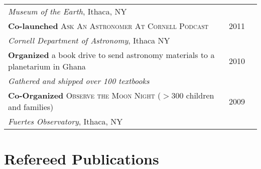 \documentclass[10pt]{article} %
\begin{document}
\begin{tabular}{l>{\hfill}p{1.1cm}r}
{\it Museum of the Earth}, Ithaca, NY \\
{\bf Co-launched} \textsc{Ask An Astronomer At Cornell Podcast} & 2011\\
{\it Cornell Department of Astronomy}, Ithaca NY  \\
{\bf Organized} a book drive to send astronomy materials to a planetarium in Ghana & 2010\\
{\it Gathered and shipped over 100 textbooks} \\
{\bf Co-Organized} \textsc{Observe the Moon Night} ($> 300$ children and families) & 2009\\
{\it Fuertes Observatory}, Ithaca, NY \\
\end{tabular}






\section{Refereed Publications}
\end{document}
